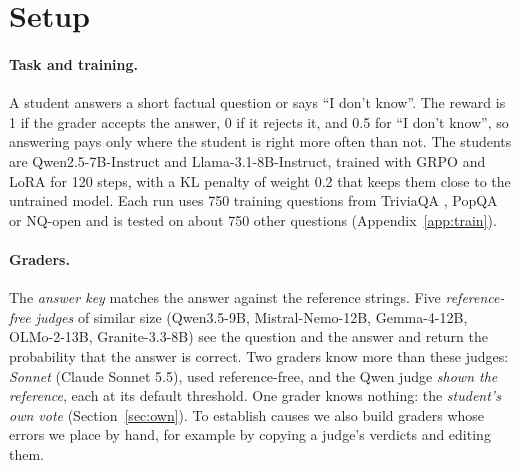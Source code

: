 \documentclass[11pt,a4paper,twocolumn]{article}
\newcommand{\idk}{``I don't know''}
\begin{document}
\section{Setup}

\paragraph{Task and training.} A student answers a short factual question or says \idk{}. The reward is 1 if the grader accepts the answer, 0 if it rejects it, and 0.5 for \idk{}, so answering pays only where the student is right more often than not. The students are Qwen2.5-7B-Instruct and Llama-3.1-8B-Instruct, trained with GRPO \citep{shao2024grpo} and LoRA \citep{hu2022lora} for 120 steps, with a KL penalty of weight 0.2 that keeps them close to the untrained model. Each run uses 750 training questions from TriviaQA \citep{joshi2017}, PopQA \citep{mallen2023} or NQ-open \citep{kwiatkowski2019,lee2019} and is tested on about 750 other questions (Appendix~\ref{app:train}).

\paragraph{Graders.} The \emph{answer key} matches the answer against the reference strings. Five \emph{reference-free judges} of similar size (Qwen3.5-9B, Mistral-Nemo-12B, Gemma-4-12B, OLMo-2-13B, Granite-3.3-8B) see the question and the answer and return the probability that the answer is correct. Two graders know more than these judges: \emph{Sonnet} (Claude Sonnet 5.5), used reference-free, and the Qwen judge \emph{shown the reference}, each at its default threshold. One grader knows nothing: the \emph{student's own vote} (Section~\ref{sec:own}). To establish causes we also build graders whose errors we place by hand, for example by copying a judge's verdicts and editing them.

\begin{table}[t]
\small
\centering
\setlength{\tabcolsep}{4.5pt}
\caption{What each grader buys. Left: true reward on new questions (100 = every answer right; \idk{} earns 50), mean of one to six runs. Right: the share of former-state capitals a student knew that it refuses after training on PopQA. $^\dagger$Some runs end up answering \idk{} to every question (four of six for the answer key, one of two for the judge shown the reference, one of six for the 50\% cut); the value is the mean of the others.}
\label{tab:main}
\end{table}
\end{document}
